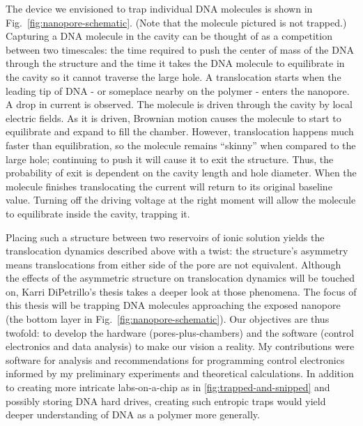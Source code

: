 \documentclass[aps,prl,preprint,groupedaddress]{revtex4}
\begin{document}
The device we envisioned to trap individual DNA molecules is shown in Fig.~\ref{fig:nanopore-schematic}.
(Note that the molecule pictured is not trapped.) Capturing a DNA molecule in the cavity can be thought of as a competition between two timescales: the time required to push the center of mass of the DNA through the structure and the time it takes the DNA molecule to equilibrate in the cavity so it cannot traverse the large hole.
A translocation starts when the leading tip of DNA  - or someplace nearby on the polymer - enters the nanopore.
A drop in current is observed.
The molecule is driven through the cavity by local electric fields.
As it is driven, Brownian motion causes the molecule to start to equilibrate and expand to fill the chamber.
However, translocation happens much faster than equilibration, so the molecule remains ``skinny'' when compared to the large hole; continuing to push it will cause it to exit the structure.
Thus, the probability of exit is dependent on the cavity length and hole diameter.
When the molecule finishes translocating the current will return to its original baseline value.
Turning off the driving voltage at the right moment will allow the molecule to equilibrate inside the cavity, trapping it.

Placing such a structure between two reservoirs of ionic solution yields the translocation dynamics described above with a twist: the structure’s asymmetry means translocations from either side of the pore are not equivalent.
Although the effects of the asymmetric structure on translocation dynamics will be touched on, Karri DiPetrillo's thesis takes a deeper look at those phenomena.
The focus of this thesis will be trapping DNA molecules approaching the exposed nanopore (the bottom layer in Fig.~\ref{fig:nanopore-schematic}).
Our objectives are thus twofold: to develop the hardware (pores-plus-chambers) and the software (control electronics and data analysis) to make our vision a reality.
My contributions were software for analysis and recommendations for programming control electronics informed by my preliminary experiments and theoretical calculations.
In addition to creating more intricate labs-on-a-chip as in \ref{fig:trapped-and-snipped} and possibly storing DNA hard drives, creating such entropic traps would yield deeper understanding of DNA as a polymer more generally.
\end{document}
